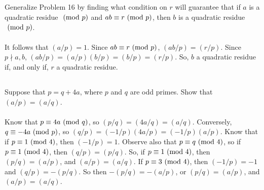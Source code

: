 \documentclass{article} \usepackage{amsmath}
\begin{document}
\subsection{}
Generalize Problem 16 by finding what condition on $r$ will guarantee that if
$a$ is a quadratic residue $\ (\mathrm{mod}\ p)$ and $ab \equiv r \ (\mathrm{mod}\ p)$, then $b$ is a quadratic
residue $\ (\mathrm{mod}\ p)$.\\~\\
It follows that $(a/p) = 1$.
Since $ab \equiv r \ (\mathrm{mod}\ p)$, $(ab/p) = (r/p)$.
Since $p \nmid a, b$, $(ab/p) = (a/p)(b/p) = (b/p) = (r/p)$.
So, $b$ a quadratic residue if, and only if, $r$ a quadratic residue.

\subsection{}
Suppose that $p = q + 4a$, where $p$ and $q$ are odd primes.
Show that $(a/p) = (a/q)$.\\~\\
Know that $p \equiv 4a \ (\mathrm{mod}\ q)$, so $(p/q) = (4a/q) = (a/q)$.
Conversely, $q \equiv -4a \ (\mathrm{mod}\ p)$, so $(q/p) = (-1/p)(4a/p) = (-1/p)(a/p)$.
Know that if $p \equiv 1 \ (\mathrm{mod}\ 4)$, then $(-1/p) = 1$.
Observe also that $p \equiv q \ (\mathrm{mod}\ 4)$, so if $p \equiv 1 \ (\mathrm{mod}\ 4)$, then $(q/p) = (p/q)$.
So, if $p \equiv 1 \ (\mathrm{mod}\ 4)$, then $(p/q) = (a/p)$, and $(a/p) = (a/q)$.
If $p \equiv 3 \ (\mathrm{mod}\ 4)$, then $(-1/p) = -1$ and $(q/p) = -(p/q)$.
So then $-(p/q) = -(a/p)$, or $(p/q) = (a/p)$, and $(a/p) = (a/q)$.
\end{document}
